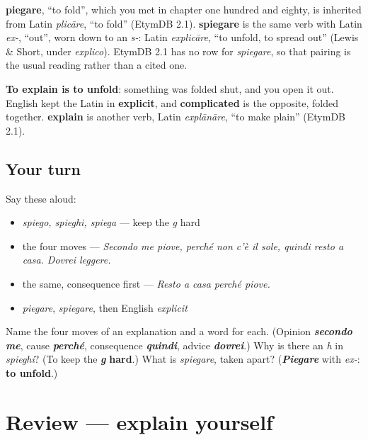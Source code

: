 \begin{cousinweb}
\textbf{piegare}, \textquotedblleft{}to fold\textquotedblright{}, which you met in chapter one hundred and eighty, is inherited from Latin \emph{plicāre}, \textquotedblleft{}to fold\textquotedblright{} (EtymDB 2.1). \textbf{spiegare} is the same verb with Latin \emph{ex-}, \textquotedblleft{}out\textquotedblright{}, worn down to an \emph{s-}: Latin \emph{explicāre}, \textquotedblleft{}to unfold, to spread out\textquotedblright{} (Lewis \& Short, under \emph{explico}). EtymDB 2.1 has no row for \emph{spiegare}, so that pairing is the usual reading rather than a cited one.

\textbf{To explain is to unfold}: something was folded shut, and you open it out. English kept the Latin in \textbf{explicit}, and \textbf{complicated} is the opposite, folded together. \textbf{explain} is another verb, Latin \emph{explānāre}, \textquotedblleft{}to make plain\textquotedblright{} (EtymDB 2.1).
\end{cousinweb}

\subsection*{Your turn}
Say these aloud:

\begin{itemize}
\raggedright
  \item \emph{spiego, spieghi, spiega} — keep the \emph{g} hard
  \item the four moves — \emph{Secondo me piove, perché non c'è il sole, quindi resto a casa. Dovrei leggere.}
  \item the same, consequence first — \emph{Resto a casa perché piove.}
  \item \emph{piegare}, \emph{spiegare}, then English \emph{explicit}
\end{itemize}

\begin{tcolorbox}[breakable,colback=teal!4,colframe=teal!35!black,title={Before you move on}]
Name the four moves of an explanation and a word for each. (Opinion \emph{\textbf{secondo me}}, cause \emph{\textbf{perché}}, consequence \emph{\textbf{quindi}}, advice \emph{\textbf{dovrei}}.) Why is there an \emph{h} in \emph{spieghi}? (To keep the \emph{\textbf{g}} \textbf{hard}.) What is \emph{spiegare}, taken apart? (\emph{\textbf{Piegare}} with \emph{ex-}: \textbf{to unfold}.)
\end{tcolorbox}
\section[(review)]{Review — explain yourself}

